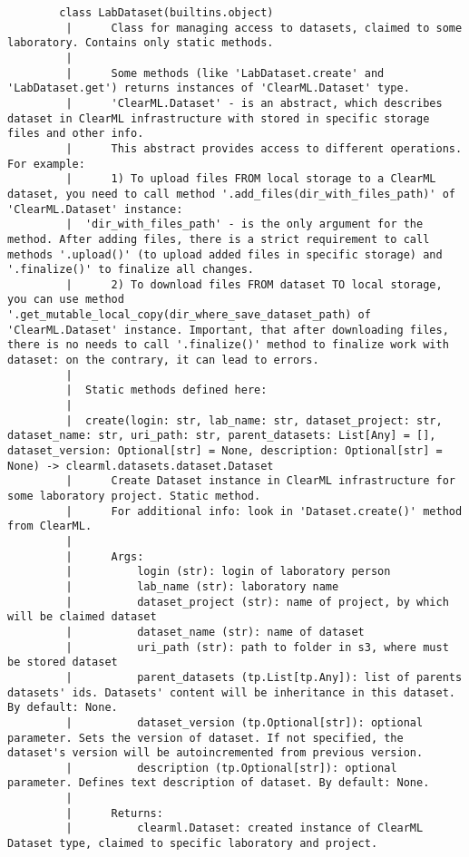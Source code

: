 \begin{lstlisting}
		class LabDataset(builtins.object)
		 |      Class for managing access to datasets, claimed to some laboratory. Contains only static methods.
		 |  
		 |      Some methods (like 'LabDataset.create' and 'LabDataset.get') returns instances of 'ClearML.Dataset' type.
		 |      'ClearML.Dataset' - is an abstract, which describes dataset in ClearML infrastructure with stored in specific storage files and other info. 
		 |      This abstract provides access to different operations. For example:
		 |      1) To upload files FROM local storage to a ClearML dataset, you need to call method '.add_files(dir_with_files_path)' of 'ClearML.Dataset' instance:
		 |  'dir_with_files_path' - is the only argument for the method. After adding files, there is a strict requirement to call methods '.upload()' (to upload added files in specific storage) and '.finalize()' to finalize all changes.
		 |      2) To download files FROM dataset TO local storage, you can use method '.get_mutable_local_copy(dir_where_save_dataset_path) of 'ClearML.Dataset' instance. Important, that after downloading files, there is no needs to call '.finalize()' method to finalize work with dataset: on the contrary, it can lead to errors.
		 |  
		 |  Static methods defined here:
		 |  
		 |  create(login: str, lab_name: str, dataset_project: str, dataset_name: str, uri_path: str, parent_datasets: List[Any] = [], dataset_version: Optional[str] = None, description: Optional[str] = None) -> clearml.datasets.dataset.Dataset
		 |      Create Dataset instance in ClearML infrastructure for some laboratory project. Static method.
		 |      For additional info: look in 'Dataset.create()' method from ClearML.
		 |      
		 |      Args:
		 |          login (str): login of laboratory person
		 |          lab_name (str): laboratory name
		 |          dataset_project (str): name of project, by which will be claimed dataset
		 |          dataset_name (str): name of dataset
		 |          uri_path (str): path to folder in s3, where must be stored dataset
		 |          parent_datasets (tp.List[tp.Any]): list of parents datasets' ids. Datasets' content will be inheritance in this dataset. By default: None.
		 |          dataset_version (tp.Optional[str]): optional parameter. Sets the version of dataset. If not specified, the dataset's version will be autoincremented from previous version.
		 |          description (tp.Optional[str]): optional parameter. Defines text description of dataset. By default: None.
		 |      
		 |      Returns:
		 |          clearml.Dataset: created instance of ClearML Dataset type, claimed to specific laboratory and project.

\end{lstlisting}
